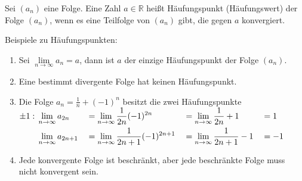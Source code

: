 \documentclass[a4paper,titlepage,oneside]{article}
\def\R{\ensuremath{\mathbb{R}} }
\renewcommand{\liminf}[2][n]{\ensuremath{\lim\limits_{#1 \rightarrow \infty}{#2}}}
\theoremstyle{thmstyle}
\begin{document}
\begin{subdefi}
Sei \((a_n)\) eine Folge. Eine Zahl \(a \in \R\) heißt Häufungspunkt (Häufungswert) der Folge \((a_n)\), wenn es eine Teilfolge von \((a_n)\) gibt, die gegen \(a\) konvergiert.
\end{subdefi}

\begin{subbem}
Beispiele zu Häufungspunkten:
\begin{enumerate}
\item Sei \(\liminf{a_n} = a\), dann ist \(a\) der einzige Häufungspunkt der Folge \((a_n)\).
\item Eine bestimmt divergente Folge hat keinen Häufungspunkt.
\item Die Folge $ \displaystyle a_n = \frac{1}{n}+ (-1)^n $ besitzt die zwei Häufungspunkte $ \displaystyle \pm 1:\\
\begin{aligned}[t] &\liminf{a_{2n}} &&= \liminf{\frac{1}{2n} (-1)^{2n}} &&= \liminf{\frac{1}{2n}} + 1 &&= 1 \\
&\liminf{a_{2n+1}} &&= \liminf{\frac{1}{2n+1} (-1)^{2n+1}} &&= \liminf{\frac{1}{2n+1}} - 1 &&= - 1
\end{aligned}$
\item Jede konvergente Folge ist beschränkt, aber jede beschränkte Folge muss nicht konvergent sein.
\end{enumerate}
\end{subbem}
\end{document}
